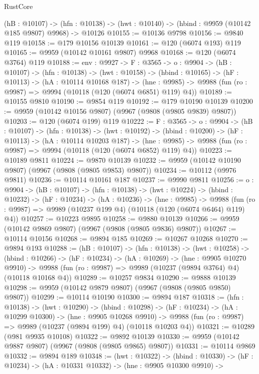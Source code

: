 \begin{lexlean}{RustCore}
\begin{coremodule}
  (hB : @10107) ->
  (hfn : @10138) -> (hwt : @10140) -> (hbind : @9959 (@10142 @185 @9807) @9968) -> @10126
@10155 := @10136 @9798
@10156 := @9840 @119
@10158 := @179 @10156 @10139
@10161 := @120 (@6074 @193) @119
@10165 := @9959 (@10142 @10161 @9807) @9968
@10168 := @120 (@6074 @3764) @119
@10188 := {env : @9927} ->
  {F : @3565} ->
  {o : @9904} ->
  (hB : @10107) ->
  (hfn : @10138) ->
  (hwt : @10158) ->
  (hbind : @10165) ->
  (hF : @10113) ->
  (hA : @10114 @10168 @187) ->
  (hne : @9985) -> @9988 (fun (ro : @9987) => @9994 (@10118 (@120 (@6074 @6851) @119) @4))
@10189 := @10155 @9810
@10190 := @9854 @119
@10192 := @179 @10190 @10139
@10200 := @9959 (@10142 @10156 @9807) (@9967 (@9808 (@9805 @9839) @9807))
@10203 := @120 (@6074 @199) @119
@10222 := {F : @3565} ->
  {o : @9904} ->
  (hB : @10107) ->
  (hfn : @10138) ->
  (hwt : @10192) ->
  (hbind : @10200) ->
  (hF : @10113) ->
  (hA : @10114 @10203 @187) ->
  (hne : @9985) -> @9988 (fun (ro : @9987) => @9994 (@10118 (@120 (@6074 @6852) @119) @4))
@10223 := @10189 @9811
@10224 := @9870 @10139
@10232 := @9959 (@10142 @10190 @9807) (@9967 (@9808 (@9805 @9853) @9807))
@10234 := @10112 (@9976 @9811)
@10236 := @10114 @10161 @187
@10237 := @9990 @9811
@10256 := {o : @9904} ->
  (hB : @10107) ->
  (hfn : @10138) ->
  (hwt : @10224) ->
  (hbind : @10232) ->
  (hF : @10234) ->
  (hA : @10236) ->
  (hne : @9985) ->
  @9988 (fun (ro : @9987) => @9989 (@10237 @199 @4) (@10118 (@120 (@6074 @6464) @119) @4))
@10257 := @10223 @9895
@10258 := @9880 @10139
@10266 := @9959 (@10142 @9869 @9807) (@9967 (@9808 (@9805 @9836) @9807))
@10267 := @10114 @10156
@10268 := @9894 @185
@10269 := @10267 @10268
@10270 := @9894 @193
@10288 := (hB : @10107) ->
  (hfn : @10138) ->
  (hwt : @10258) ->
  (hbind : @10266) ->
  (hF : @10234) ->
  (hA : @10269) ->
  (hne : @9905 @10270 @9910) ->
  @9988 (fun (ro : @9987) => @9989 (@10237 (@9894 @3764) @4) (@10118 @10168 @4))
@10289 := @10257 @9834
@10290 := @9888 @10139
@10298 := @9959 (@10142 @9879 @9807) (@9967 (@9808 (@9805 @9850) @9807))
@10299 := @10114 @10190
@10300 := @9894 @187
@10318 := (hfn : @10138) ->
  (hwt : @10290) ->
  (hbind : @10298) ->
  (hF : @10234) ->
  (hA : @10299 @10300) ->
  (hne : @9905 @10268 @9910) ->
  @9988 (fun (ro : @9987) => @9989 (@10237 (@9894 @199) @4) (@10118 @10203 @4))
@10321 := @10289 (@981 @9935 @10108)
@10322 := @9892 @10139
@10330 := @9959 (@10142 @9887 @9807) (@9967 (@9808 (@9805 @9865) @9807))
@10331 := @10114 @9869
@10332 := @9894 @189
@10348 := (hwt : @10322) ->
  (hbind : @10330) ->
  (hF : @10234) ->
  (hA : @10331 @10332) ->
  (hne : @9905 @10300 @9910) ->

\end{coremodule}
\end{lexlean}
